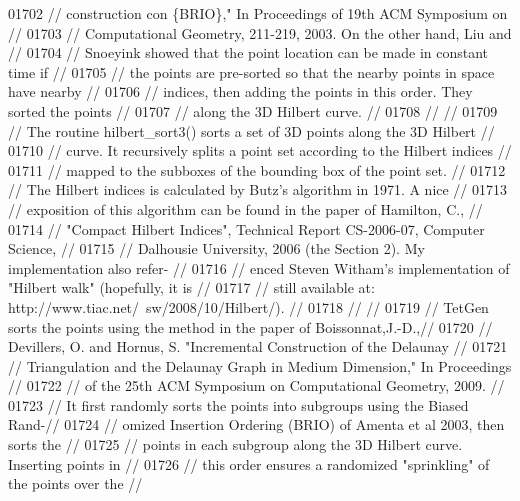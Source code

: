 \begin{DoxyCode}
01702 \textcolor{comment}{// construction con \{BRIO\}," In Proceedings of 19th ACM Symposium on         //}
01703 \textcolor{comment}{// Computational Geometry, 211-219, 2003.  On the other hand, Liu and        //}
01704 \textcolor{comment}{// Snoeyink showed that the point location can be made in constant time if   //}
01705 \textcolor{comment}{// the points are pre-sorted so that the nearby points in space have nearby  //}
01706 \textcolor{comment}{// indices, then adding the points in this order. They sorted the points     //}
01707 \textcolor{comment}{// along the 3D Hilbert curve.                                               //}
01708 \textcolor{comment}{//                                                                           //}
01709 \textcolor{comment}{// The routine hilbert\_sort3() sorts a set of 3D points along the 3D Hilbert //}
01710 \textcolor{comment}{// curve. It recursively splits a point set according to the Hilbert indices //}
01711 \textcolor{comment}{// mapped to the subboxes of the bounding box of the point set.              //}
01712 \textcolor{comment}{//   The Hilbert indices is calculated by Butz's algorithm in 1971.  A nice  //}
01713 \textcolor{comment}{// exposition of this algorithm can be found in the paper of Hamilton, C.,   //}
01714 \textcolor{comment}{// "Compact Hilbert Indices", Technical Report CS-2006-07, Computer Science, //}
01715 \textcolor{comment}{// Dalhousie University, 2006 (the Section 2). My implementation also refer- //}
01716 \textcolor{comment}{// enced Steven Witham's implementation of "Hilbert walk" (hopefully, it is  //}
01717 \textcolor{comment}{// still available at: http://www.tiac.net/~sw/2008/10/Hilbert/).            //}
01718 \textcolor{comment}{//                                                                           //}
01719 \textcolor{comment}{// TetGen sorts the points using the method in the paper of Boissonnat,J.-D.,//}
01720 \textcolor{comment}{// Devillers, O. and Hornus, S. "Incremental Construction of the Delaunay    //}
01721 \textcolor{comment}{// Triangulation and the Delaunay Graph in Medium Dimension," In Proceedings //}
01722 \textcolor{comment}{// of the 25th ACM Symposium on Computational Geometry, 2009.                //}
01723 \textcolor{comment}{//   It first randomly sorts the points into subgroups using the Biased Rand-//}
01724 \textcolor{comment}{// omized Insertion Ordering (BRIO) of Amenta et al 2003, then sorts the     //}
01725 \textcolor{comment}{// points in each subgroup along the 3D Hilbert curve.  Inserting points in  //}
01726 \textcolor{comment}{// this order ensures a randomized "sprinkling" of the points over the       //}

\end{DoxyCode}

